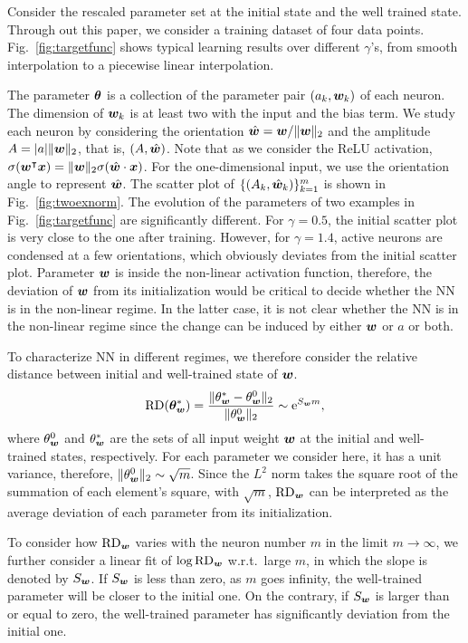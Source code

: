\documentclass{article}
\begin{document}
Consider the rescaled parameter set at the initial state and the well trained state. Through out this paper, we consider a training dataset of four data points. Fig.~\ref{fig:targetfunc} shows typical learning results over different $\gamma$'s, from smooth interpolation to a piecewise linear interpolation.

The parameter $\bm{\theta}$ is a collection of the parameter pair $(a_k,\bm{w}_k)$ of each neuron. The dimension of $\bm{w}_k$ is at least two with the input and the bias term. We study each neuron by considering the orientation $\hat{\bm{w}}=\bm{w}/\lVert\bm{w}\rVert_{2}$ and the amplitude $A=|a|\lVert\bm{w}\rVert_{2}$, that is, $(A,\hat{\bm{w}})$.  Note that as we consider the ReLU activation, $\sigma(\bm{w}^\intercal\bm{x})=\lVert\bm{w}\rVert_{2}\sigma(\hat{\bm{w}}\cdot\bm{x})$.  For the one-dimensional input, we use the orientation angle to represent $\hat{\bm{w}}$. The scatter plot of $\{(A_k,\hat{\bm{w}}_k)\}_{k=1}^{m}$ is shown in Fig.~\ref{fig:twoexnorm}. The evolution of the parameters of two examples in Fig.~\ref{fig:targetfunc} are significantly different. For $\gamma=0.5$, the initial scatter plot is very close to the one after training. However, for $\gamma=1.4$, active neurons are condensed at a few orientations, which obviously deviates from the initial scatter plot. Parameter $\bm{w}$ is inside the non-linear activation function, therefore, the deviation of $\bm{w}$ from its initialization would be critical to decide whether the NN is in the non-linear regime. In the latter case, it is not clear whether the NN is in the non-linear regime since the change can be induced by either $\bm{w}$ or $a$ or both.

 

To characterize NN in different regimes, we therefore consider the relative  distance between initial and well-trained state of $\bm{w}$.
\begin{equation}
    \mathrm{RD}(\bm{\theta}^*_{\bm{w}})=\frac{\lVert\theta_{\bm{w}}^*-\theta_{\bm{w}}^{0}\rVert_{2}}{\lVert\theta_{\bm{w}}^{0}\rVert_{2}}\sim \mathrm{e}^{S_{\bm{w}}m},
\end{equation}
where $\theta_{\bm{w}}^{0}$ and $\theta_{\bm{w}}^*$ are the sets of all input weight $\bm{w}$ at the initial and well-trained states, respectively. For each parameter we consider here, it has a unit variance, therefore, $\lVert\theta_{\bm{w}}^{0}\rVert_{2}\sim \sqrt{m}$. Since the $L^2$ norm takes the square root of the summation of each element's square, with $\sqrt{m}$, $\mathrm{RD}_{\bm{w}}$ can be interpreted as the average deviation of each parameter from its initialization.

To consider how $\mathrm{RD}_{\bm{w}}$ varies with the neuron number $m$ in the limit $m\to \infty$, we further consider a linear fit of $\log \mathrm{RD}_{\bm{w}}$ w.r.t.\ large $m$, in which the slope is denoted by $S_{\bm{w}}$. If $S_{\bm{w}}$ is less than zero, as $m$ goes infinity, the well-trained parameter will be closer to the initial one. On the contrary, if $S_{\bm{w}}$ is larger than or equal to zero, the well-trained parameter has significantly deviation from the initial one.
\end{document}
